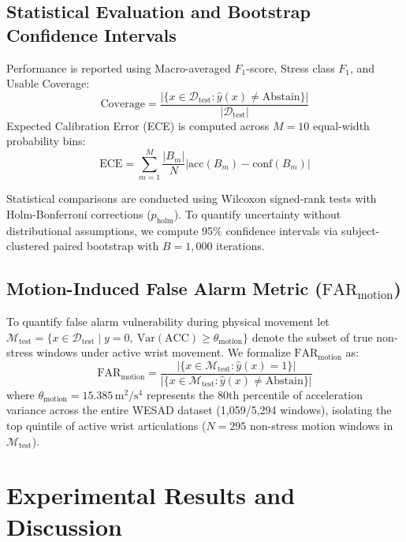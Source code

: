\documentclass[conference]{IEEEtran}
\begin{document}
\subsection{Statistical Evaluation and Bootstrap Confidence Intervals}
Performance is reported using Macro-averaged $F_1$-score, Stress class $F_1$, and Usable Coverage:
\begin{equation}
\text{Coverage} = \frac{|\{x \in \mathcal{D}_{\text{test}} : \hat{y}(x) \neq \text{Abstain}\}|}{|\mathcal{D}_{\text{test}}|}
\end{equation}
Expected Calibration Error (ECE) is computed across $M=10$ equal-width probability bins:
\begin{equation}
\text{ECE} = \sum_{m=1}^M \frac{|B_m|}{N} \left| \text{acc}(B_m) - \text{conf}(B_m) \right|
\end{equation}

Statistical comparisons are conducted using Wilcoxon signed-rank tests with Holm-Bonferroni corrections ($p_{\text{holm}}$). To quantify uncertainty without distributional assumptions, we compute 95\% confidence intervals via subject-clustered paired bootstrap with $B=1,000$ iterations.

\subsection{Motion-Induced False Alarm Metric ($\text{FAR}_{\text{motion}}$)}
To quantify false alarm vulnerability during physical movement let $\mathcal{M}_{\text{test}} = \{x \in \mathcal{D}_{\text{test}} \mid y=0, \ \text{Var}(\text{ACC}) \ge \theta_{\text{motion}}\}$ denote the subset of true non-stress windows under active wrist movement. We formalize $\text{FAR}_{\text{motion}}$ as:
\begin{equation}
\text{FAR}_{\text{motion}} = \frac{|\{x \in \mathcal{M}_{\text{test}} : \hat{y}(x) = 1\}|}{|\{x \in \mathcal{M}_{\text{test}} : \hat{y}(x) \neq \text{Abstain}\}|}
\end{equation}
where $\theta_{\text{motion}} = 15.385$\,$\text{m}^2/\text{s}^4$ represents the 80th percentile of acceleration variance across the entire WESAD dataset (1,059/5,294 windows), isolating the top quintile of active wrist articulations ($N=295$ non-stress motion windows in $\mathcal{M}_{\text{test}}$).

\section{Experimental Results and Discussion}
\end{document}
